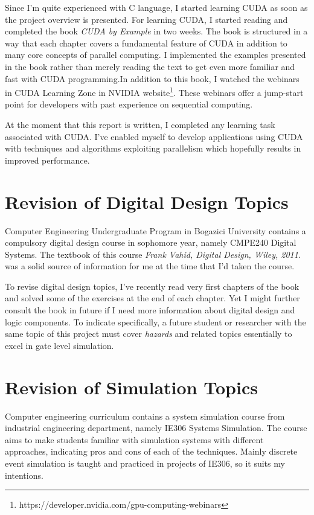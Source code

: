 \documentclass[a4paper,onesided,12pt]{report}
\begin{document}
 Since I'm quite experienced with C language, I started learning CUDA as soon as the project overview is presented. For learning CUDA, I started reading and completed the book \emph{CUDA by Example}\cite{cuda_be} in two weeks. The book is structured in a way that each chapter covers a fundamental feature of CUDA in addition to many core concepts of parallel computing. I implemented the examples presented in the book rather than merely reading the text to get even more familiar and fast with CUDA programming.In addition to this book, I watched the webinars in CUDA Learning Zone in NVIDIA website\footnote{https://developer.nvidia.com/gpu-computing-webinars}. These webinars offer a jump-start point for developers with past experience on sequential computing.
 
 At the moment that this report is written, I completed any learning task associated with CUDA. I've enabled myself to develop applications using CUDA with techniques and algorithms exploiting parallelism which hopefully results in improved performance. 
 
 \section{Revision of Digital Design Topics}
 
 Computer Engineering Undergraduate Program in Bogazici University contains a compulsory digital design course in sophomore year, namely CMPE240 Digital Systems. The textbook of this course \emph{Frank Vahid, Digital Design, Wiley, 2011.} was a solid source of information for me at the time that I'd taken the course.
 
 To revise digital design topics, I've recently read very first chapters of the book and solved some of the exercises at the end of each chapter. Yet I might further consult the book in future if I need more information about digital design and logic components. To indicate specifically, a future student or researcher with the same topic of this project must cover \emph{hazards} and related topics essentially to excel in gate level simulation.
 
 \section{Revision of Simulation Topics}
 
 Computer engineering curriculum contains a system simulation course from industrial engineering department, namely IE306 Systems Simulation. The course aims to make students familiar with simulation systems with different approaches, indicating pros and cons of each of the techniques. Mainly discrete event simulation is taught and practiced in projects of IE306, so it suits my intentions.
 
\end{document}
